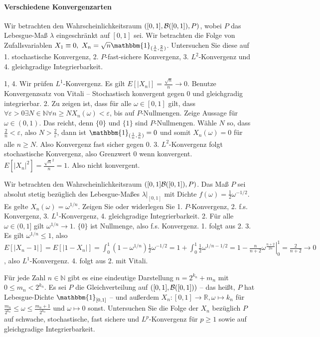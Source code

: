 \documentclass{article}
\begin{document}
\paragraph{Verschiedene Konvergenzarten}
Wir betrachten den Wahrscheinlichkeitsraum $([0,1],{\cal B}([0,1]),P)$, wobei $P$ das Lebesgue-Maß $\lambda$ eingeschränkt auf $[0,1]$ sei.
Wir betrachten die Folge von Zufallsvariablen $X_1\equiv0,~X_n=\sqrt{n}\mathbbm{1}_{(\frac{1}{n},\frac{2}{n})}$.
Untersuchen Sie diese auf 1. stochastische Konvergenz, 2. $P$-fast-sichere Konvergenz, 3. $L^2$-Konvergenz und 4. gleichgradige  Integrierbarkeit.

1, 4. Wir prüfen $L^1$-Konvergenz.
Es gilt $E[|X_n|]=\frac{\sqrt{n}}{n}\to0$.
Benutze Konvergenzsatz von Vitali -- Stochastisch konvergent gegen 0 und gleichgradig integrierbar.
2. Zu zeigen ist, dass für alle $\omega\in[0,1]$ gilt, dass $\forall\varepsilon>0\exists N\in\mathbb{N}\forall n\geq N X_n(\omega)<\varepsilon$, bis auf $P$-Nullmengen.
Zeige Aussage für $\omega\in(0,1)$.
Das reicht, denn $\{0\}$ und $\{1\}$ sind $P$-Nullmengen.
Wähle $N$ so, dass $\frac{2}{n}<\varepsilon$, also $N>\frac{2}{\varepsilon}$, dann ist $\mathbbm{1}_{(\frac{1}{n},\frac{2}{n})}=0$ und somit $X_n(\omega)=0$ für alle $n\geq N$.
Also Konvergenz fast sicher gegen 0.
3. $L^2$-Konvergenz folgt stochastische Konvergenz, also Grenzwert 0 wenn konvergent.
$E[|X_n|^2]=\frac{\sqrt{n}^2}{n}=1$.
Also nicht konvergent.

Wir betrachten den Wahrscheinlichkeitsraum $([0,1]{\cal B}([0,1]),P)$.
Das Maß $P$ sei absolut stetig bezüglich des Lebesgue-Maßes $\lambda|_{[0,1]}$ mit Dichte $f(\omega)=\frac{1}{2}\omega^{-1/2}$. Es gelte $X_n(\omega)=\omega^{1/n}$.
Zeigen Sie oder widerlegen Sie  1. $P$-Konvergenz, 2. f.s. Konvergenz, 3. $L^1$-Konvergenz, 4. gleichgradige Integrierbarkeit.
2. Für alle $\omega\in(0,1]$ gilt $\omega^{1/n}\to1$.
$\{0\}$ ist Nullmenge, also f.s. Konvergenz.
1. folgt aus 2.
3. Es gilt $\omega^{1/n}\leq1$, also $E[|X_n-1|]=E[|1-X_n|]=\int_0^1(1-\omega^{1/n})\frac{1}{2}\omega^{-1/2}=1+\int_0^1\frac{1}{2}\omega^{1/n-1/2}=1-\left.\frac{n}{n+2}\omega^{\frac{n+2}{2n}}\right|_0^1=\frac{2}{n+2}\to0$, also $L^1$-Konvergenz.
4. folgt aus 2. mit Vitali.

Für jede Zahl $n\in\mathbb{N}$ gibt es eine eindeutige Darstellung $n=2^{k_n}+m_n$ mit $0\leq m_n<2^{k_n}$.
Es sei $P$ die Gleichverteilung auf $([0,1],{\cal B}([0,1]))$ -- das heißt, $P$ hat Lebesgue-Dichte $\mathbbm{1}_{[0,1]}$ -- und außerdem $X_n\colon [0,1]\to\mathbb{R}, \omega\mapsto k_n$ für $\frac{m_n}{2^{k_n}}\leq\omega\leq\frac{m_n+1}{2^{k_n}}$ und $\omega\mapsto 0$ sonst.
Untersuchen Sie die Folge der $X_n$ bezüglich $P$ auf schwache, stochastische, fast sichere und $L^p$-Konvergenz für $p\geq1$ sowie auf gleichgradige Integrierbarkeit.
\end{document}
